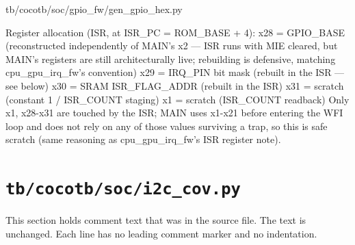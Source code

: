 \begin{relocated}{tb/cocotb/soc/gpio_fw/gen_gpio_hex.py}
\begin{textblock}
Register allocation (ISR, at ISR_PC = ROM_BASE + 4):
x28 = GPIO_BASE (reconstructed independently of MAIN's x2 — ISR runs with
MIE cleared, but MAIN's registers are still architecturally live;
rebuilding is defensive, matching cpu_gpu_irq_fw's convention)
x29 = IRQ_PIN bit mask (rebuilt in the ISR — see below)
x30 = SRAM ISR_FLAG_ADDR (rebuilt in the ISR)
x31 = scratch (constant 1 / ISR_COUNT staging)
x1  = scratch (ISR_COUNT readback)
Only x1, x28-x31 are touched by the ISR; MAIN uses x1-x21 before entering
the WFI loop and does not rely on any of those values surviving a trap, so
this is safe scratch (same reasoning as cpu_gpu_irq_fw's ISR register note).
\end{textblock}

\end{relocated}

\section{\texttt{tb/cocotb/soc/i2c\_cov.py}}\label{tm:suite:soc-i2c-cov}

This section holds comment text that was in the source file. The text is unchanged. Each line has no leading comment marker and no indentation.

